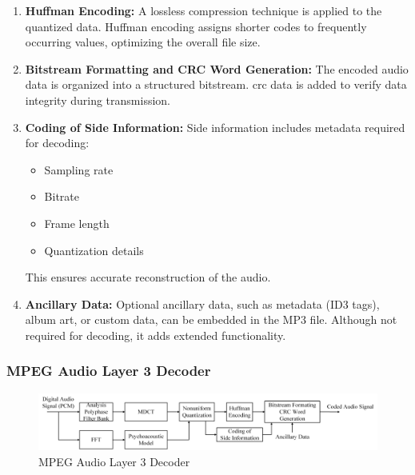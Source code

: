 \begin{enumerate}[label=\textbf{\roman*.}]
            \item \textbf{Huffman Encoding:}  
            A lossless compression technique is applied to the quantized data. Huffman encoding assigns shorter codes to frequently occurring values, optimizing the overall file size.
        
            \item \textbf{Bitstream Formatting and CRC Word Generation:}  
            The encoded audio data is organized into a structured bitstream. \gls{crc} data is added to verify data integrity during transmission.
        
            \item \textbf{Coding of Side Information:}  
            Side information includes metadata required for decoding:
            \begin{itemize}
                \item Sampling rate
                \item Bitrate
                \item Frame length
                \item Quantization details
            \end{itemize}
            This ensures accurate reconstruction of the audio.
        
            \item \textbf{Ancillary Data:}  
            Optional ancillary data, such as metadata (ID3 tags), album art, or custom data, can be embedded in the MP3 file. Although not required for decoding, it adds extended functionality.
        \end{enumerate}

        \subsubsection{MPEG Audio Layer 3 Decoder}

        \begin{figure}[H]
            \centering
            \includegraphics[width=0.95\linewidth]{assets/mp3_encoder.png}
            \caption{MPEG Audio Layer 3 Decoder}
            \label{fig:mp3_decoder}
        \end{figure}
        
